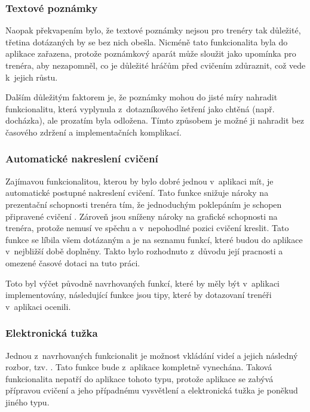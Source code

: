 \documentclass[thesis=B,czech]{FITthesis}[2012/06/26]
\begin{document}
\subsubsection{Textové poznámky}

	Naopak překvapením bylo, že textové poznámky nejsou pro trenéry tak důležité, třetina dotázaných by se bez nich obešla. Nicméně tato funkcionalita byla do aplikace zařazena, protože poznámkový aparát může sloužit jako upomínka pro trenéra, aby nezapomněl, co je důležité hráčům před cvičením zdůraznit, což vede k~jejich růstu.

	Dalším důležitým faktorem je, že poznámky mohou do jisté míry nahradit funkcionalitu, která vyplynula z~dotazníkového šetření jako chtěná (např. docházka), ale prozatím byla odložena. Tímto způsobem je možné ji nahradit bez časového zdržení a  implementačních komplikací.

\subsubsection{Automatické nakreslení cvičení}

	Zajímavou funkcionalitou, kterou by bylo dobré jednou v~aplikaci mít, je automatické postupné nakreslení cvičení. Tato funkce snižuje nároky na prezentační schopnosti trenéra tím, že jednoduchým poklepáním je schopen připravené cvičení . Zároveň jsou sníženy nároky na grafické schopnosti na trenéra, protože nemusí ve spěchu a v~nepohodlné pozici cvičení kreslit. Tato funkce se líbila všem dotázaným a je na seznamu funkcí, které budou do aplikace v~nejbližší době doplněny. Takto bylo rozhodnuto z~důvodu její pracnosti a omezené časové dotaci na tuto práci.

	Toto byl výčet původně navrhovaných funkcí, které by měly být v~aplikaci implementovány, následující funkce jsou tipy, které by dotazovaní trenéři v~aplikaci ocenili.

\subsubsection{Elektronická tužka}

	Jednou z~navrhovaných funkcionalit je možnost vkládání videí a jejich následný rozbor, tzv. . Tato funkce bude z~aplikace kompletně vynechána. Taková funkcionalita nepatří do aplikace tohoto typu, protože aplikace se zabývá přípravou cvičení a jeho případnému vysvětlení a elektronická tužka je poněkud jiného typu.
\end{document}
